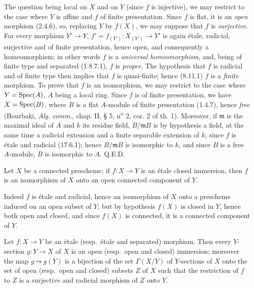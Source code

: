 The question being local on $X$ and on $Y$ (since $f$ is injective), we may restrict to the case where $Y$ is affine and $f$ of finite presentation. Since $f$ is flat, it is an \emph{open} morphism (2.4.6), so, replacing $Y$ by $f(X)$, we may suppose that $f$ is \emph{surjective}. For every morphism $Y'\to Y$, $f'=f_{(Y')}:X_{(Y')}\to Y'$ is again étale, radicial, surjective and of finite presentation, hence open, and consequently a homeomorphism; in other words $f$ is a \emph{universal homeomorphism}, and, being of finite type and separated (1.8.7.1), $f$ is \emph{proper}. The hypothesis that $f$ is radicial and of finite type then implies that $f$ is quasi-finite; hence (8.11.1) $f$ is a \emph{finite} morphism. To prove that $f$ is an isomorphism, we may restrict to the case
where $Y=\operatorname{Spec}(A)$, $A$ being a local ring. Since $f$ is of finite presentation, we have $X=\operatorname{Spec}(B)$, where $B$ is a flat $A$-module of finite presentation (1.4.7), hence \emph{free} (Bourbaki, \emph{Alg. comm.}, chap. II, § 5, n\textsuperscript{o} 2, cor. 2 of th. 1). Moreover, if $\mathfrak m$ is the maximal ideal of $A$ and $k$ its residue field, $B/\mathfrak mB$ is by hypothesis a field, at the same time a radicial extension and a finite separable extension of $k$, since $f$ is étale and radicial (17.6.1); hence $B/\mathfrak mB$ is isomorphic to $k$, and since $B$ is a free $A$-module, $B$ is isomorphic to $A$. Q.E.D.

\begin{corollary}[17.9.2]
\label{IV.17.9.2}
Let $X$ be a connected prescheme; if $f:X\to Y$ is an étale closed immersion, then $f$ is an isomorphism of $X$ onto an open connected component of $Y$.
\end{corollary}

Indeed $f$ is étale and radicial, hence an isomorphism of $X$ onto a prescheme induced on an open subset of $Y$; but by hypothesis $f(X)$ is closed in $Y$, hence both open and closed, and since $f(X)$ is connected, it is a connected component of $Y$.

\begin{corollary}[17.9.3]
\label{IV.17.9.3}
Let $f:X\to Y$ be an étale \textup{(resp.}\ étale and separated\textup{)} morphism. Then every $Y$-section $g:Y\to X$ of $X$ is an open \textup{(resp.}\ open and closed\textup{)} immersion; moreover the map $g\leadsto g(Y)$ is a bijection of the set $\Gamma(X/Y)$ of $Y$-sections of $X$ onto the set of open \textup{(resp.}\ open and closed\textup{)} subsets $Z$ of $X$ such that the restriction of $f$ to $Z$ is a surjective and radicial morphism of $Z$ onto $Y$.
\end{corollary}

